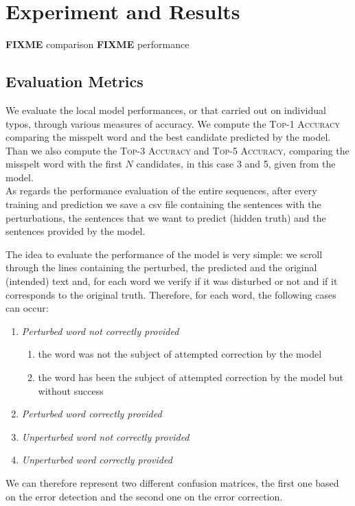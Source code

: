 \chapter{Experiment and Results}

\textbf{FIXME} comparison
\textbf{FIXME} performance

\section{Evaluation Metrics}
We evaluate the local model performances, or that carried out on individual typos, through various measures of 
accuracy. 
We compute the \textsc{Top-1 Accuracy} comparing the misspelt word and the best candidate predicted by the 
model. 
Than we also compute the \textsc{Top-3 Accuracy} and \textsc{Top-5 Accuracy}, comparing the misspelt word 
with the first $N$ candidates, in this case \num{3} and \num{5}, given from the model.\\


As regards the performance evaluation of the entire sequences, after every training and prediction we save a csv 
file containing the sentences with the perturbations, the sentences that we want to predict (hidden truth) and the 
sentences provided by the model.

The idea to evaluate the performance of the model is very simple: we scroll through the lines containing the 
perturbed, the predicted and the original (intended) text and, for each word we verify if it was disturbed or not and 
if it corresponds to the original truth.
Therefore, for each word, the following cases can occur:
\begin{enumerate}
	\item \textit{Perturbed word not correctly provided}
	\begin{enumerate}
		\item the word was not the subject of attempted correction by the model
		\item the word has been the subject of attempted correction by the model but without success
	\end{enumerate}
	\item \textit{Perturbed word correctly provided}
	\item \textit{Unperturbed word not correctly provided}
	\item \textit{Unperturbed word correctly provided}
\end{enumerate}

We can therefore represent two different confusion matrices, the first one based on the error detection and the 
second one on the error correction.

